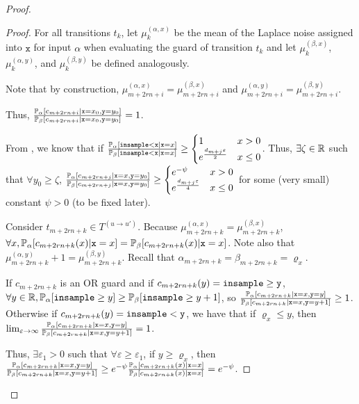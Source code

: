 \begin{proof}
\begin{proof}
		For all transitions $t_k$, let $\mu_k^{(\alpha, x)}$ be the mean of the Laplace noise assigned into $\texttt{x}$ for input $\alpha$ when evaluating the guard of transition $t_k$ and let $\mu_k^{(\beta, x)}$, $\mu_k^{(\alpha, y)}$, and $\mu_k^{(\beta, y)}$ be defined analogously. 

		Note that by construction, $\mu_{m+2rn+i}^{(\alpha, x)}=\mu_{m+2rn+i}^{(\beta, x)}$ and $\mu_{m+2rn+i}^{(\alpha, y)}=\mu_{m+2rn+i}^{(\beta, y)}$. 
		
		Thus, $\frac{\PP_\alpha[c_{m+2rn+i}|\texttt{x}=x_0, \texttt{y}=y_0]}{\PP_\beta[c_{m+2rn+i}|\texttt{x}=x_0, \texttt{y}=y_0]}=1$.

		From \cite{chadhaLinearTimeDecidability2021}, we know that if $\frac{\PP_\alpha[\lguard[\texttt{x}]|\texttt{x} = x]}{\PP_\beta[\lguard[\texttt{x}]|\texttt{x} = x]}\geq \begin{cases}
			1 & x > 0\\
			e^{\frac{d_{m+j}\varepsilon}{2}} & x\leq 0
		\end{cases}$. Thus, $\exists \zeta\in \RR$ such that $\forall y_0\geq \zeta$, $\frac{\PP_\alpha[c_{m+2rn+j}|\texttt{x} = x, \texttt{y} = y_0]}{\PP_\beta[c_{m+2rn+j}|\texttt{x} = x, \texttt{y} = y_0]}\geq \begin{cases}
			e^{-\psi} & x > 0\\
			e^{\frac{d_{m+j}\varepsilon}{4}} & x\leq 0
		\end{cases}$ for some (very small) constant $\psi>0$ (to be fixed later).

		Consider $t_{m+2rn+k}\in T^{(u\to u')}$. Because $\mu_{m+2rn+k}^{(\alpha, x)}=\mu_{m+2rn+k}^{(\beta, x)}$, $\forall x, \PP_\alpha[c_{m+2rn+k}(x)|\texttt{x}=x]=\PP_\beta[c_{m+2rn+k}(x)|\texttt{x}=x]$. Note also that $\mu_{m+2rn+k}^{(\alpha, y)}+1=\mu_{m+2rn+k}^{(\beta, y)}$. Recall that $\alpha_{m+2rn+k} = \beta_{m+2rn+k} = \varrho_x$. 
		
		If $c_{m+2rn+k}$ is an OR guard and if $c_{m+2rn+k}(y)=\gguard[\texttt{y}]$, $\forall y\in \RR, \PP_\alpha[\gguard[y]]\geq\PP_\beta[\gguard[y+1]]$, so $\frac{\PP_\alpha[c_{m+2rn+k}|\texttt{x}=x, \texttt{y}=y]}{\PP_\beta[c_{m+2rn+k}|\texttt{x}=x, \texttt{y}=y+1]}\geq 1$. 
		Otherwise if $c_{m+2rn+k}(y)=\lguard[\texttt{y}]$, we have that if $\varrho_x\leq y$, then $\lim_{\varepsilon\to\infty}\frac{\PP_\alpha[c_{m+2rn+k}|\texttt{x}=x, \texttt{y}=y]}{\PP_\beta[c_{m+2rn+k}|\texttt{x}=x, \texttt{y}=y+1]} = 1$.
			
		Thus, $\exists \varepsilon_1>0$ such that $\forall \varepsilon\geq \varepsilon_1$, if $y\geq \varrho_x$, then $\frac{\PP_\alpha[c_{m+2rn+k}|\texttt{x}=x, \texttt{y}=y]}{\PP_\beta[c_{m+2rn+k}|\texttt{x}=x, \texttt{y}=y+1]}\geq e^{-\psi}\frac{\PP_\alpha[c_{m+2rn+k}(x)|\texttt{x}=x]}{\PP_\beta[c_{m+2rn+k}(x)|\texttt{x}=x]}=e^{-\psi}$. 


\end{proof}
\end{proof}
